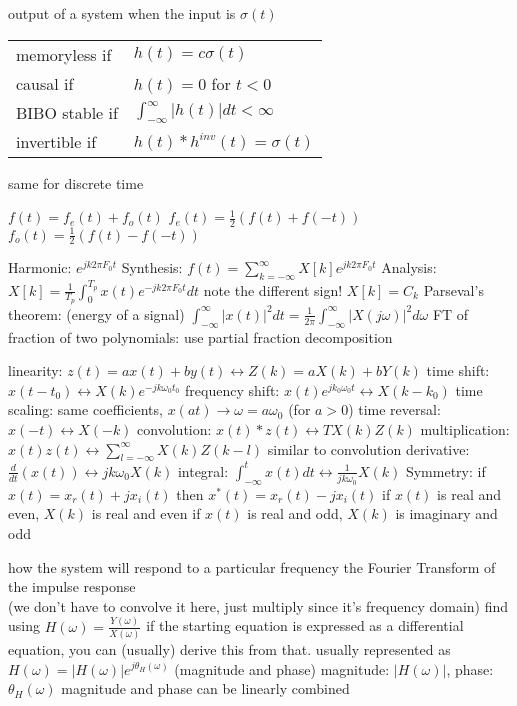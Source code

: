 \documentclass[12pt]{article}
\begin{document}
\begin{multicols*}{2}
\begin{flushleft}
\begin{outline}[longenum]
  \1 output of a system when the input is $\sigma(t)$
  \1 \begin{tabular}{l l}
    memoryless if  & $h(t) = c\sigma(t)$                          \\
    causal if      & $h(t)=0$ for $t<0$                           \\
    BIBO stable if & $\int_{-\infty}^{\infty} |h(t)| dt < \infty$ \\
    invertible if  & $h(t)*h^{inv}(t)=\sigma(t)$                  \\
  \end{tabular}
    \2 same for discrete time


  \1 $f(t) = f_e(t) + f_o(t)$
  \1 $f_e(t) = \frac{1}{2} ( f(t) + f(-t) )$
  \1 $f_o(t) = \frac{1}{2} ( f(t) - f(-t) )$


  \1 Harmonic: $e^{jk2\pi F_0 t}$
  \1 Synthesis: $f(t) = \sum_{k=-\infty}^{\infty} X[k] e^{jk2\pi F_0 t}$
  \1 Analysis: $X[k] = \frac{1}{T_p}\int_{0}^{T_p} x(t) e^{-jk2\pi F_0 t} dt$
    \2 note the different sign!
  \1 $X[k] = C_k$
  \1 Parseval's theorem: (energy of a signal)
    $\int_{-\infty}^{\infty} |x(t)|^2 dt = \frac{1}{2\pi} \int_{-\infty}^{\infty} |X(j\omega)|^2 d\omega$
  \1 FT of fraction of two polynomials: use partial fraction decomposition

  \1 linearity: $z(t) = ax(t)+by(t) \leftrightarrow Z(k) = aX(k)+bY(k) $
  \1 time shift: $x(t-t_0) \leftrightarrow X(k)e^{-jk\omega_0t_0}$
  \1 frequency shift: $x(t)e^{jk_0\omega_0t} \leftrightarrow X(k-k_0)$
  \1 time scaling: same coefficients, $x(at) \rightarrow \omega = a\omega_0$ (for $a>0$)
  \1 time reversal: $x(-t) \leftrightarrow X(-k)$
  \1 convolution: $x(t)\ast z(t) \leftrightarrow TX(k)Z(k) $
  \1 multiplication: $x(t)z(t) \leftrightarrow \sum_{l=-\infty}^{\infty} X(k)Z(k-l)$
    \2 similar to convolution
  \1 derivative: $\frac{d}{dt}(x(t)) \leftrightarrow jk\omega_0 X(k) $
  \1 integral: $\int_{-\infty}^{t} x(t) dt \leftrightarrow \frac{1}{jk\omega_0} X(k) $
  \1 Symmetry: if $x(t)=x_r(t)+jx_i(t)$ then $x^*(t)=x_r(t)-jx_i(t)$
  \1 if $x(t)$ is real and even, $X(k)$ is real and even
  \1 if $x(t)$ is real and odd, $X(k)$ is imaginary and odd

  \1 how the system will respond to a particular frequency
  \1 the Fourier Transform of the impulse response
    \\ (we don't have to convolve it here, just multiply since it's frequency domain)
  \1 find using $H(\omega)=\frac{Y(\omega)}{X(\omega)}$
    \2 if the starting equation is expressed as a differential equation, you can (usually) derive this from that.
  \1 usually represented as $H(\omega)=|H(\omega)|e^{j\theta_H(\omega)}$ (magnitude and phase)
    \2 magnitude: $|H(\omega)|$, phase: $\theta_H(\omega)$
  \1 magnitude and phase can be linearly combined


\end{outline}
\end{flushleft}
\end{multicols*}
\end{document}
